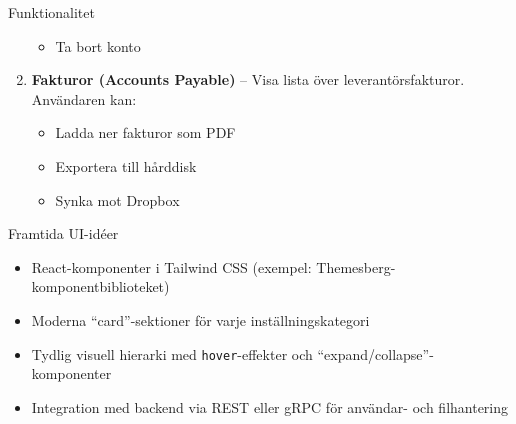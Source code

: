 \documentclass[10pt]{beamer}
\begin{document}
\begin{frame}[fragile]
\begin{block}{Funktionalitet}
\begin{enumerate}
\begin{itemize}
          \item Ta bort konto
        \end{itemize}
      \vspace{0.2cm}
      \item \textbf{Fakturor (Accounts Payable)} – Visa lista över leverantörsfakturor.
      Användaren kan:
        \begin{itemize}
          \item Ladda ner fakturor som PDF
          \item Exportera till hårddisk
          \item Synka mot Dropbox
        \end{itemize}
    \end{enumerate}
  \end{block}

  \vspace{0.4cm}

  \begin{block}{Framtida UI-idéer}
    \begin{itemize}
      \item React-komponenter i Tailwind CSS (exempel: Themesberg-komponentbiblioteket)
      \item Moderna “card”-sektioner för varje inställningskategori
      \item Tydlig visuell hierarki med \texttt{hover}-effekter och “expand/collapse”-komponenter
      \item Integration med backend via REST eller gRPC för användar- och filhantering
    \end{itemize}
  \end{block}
\end{frame}
\end{document}
